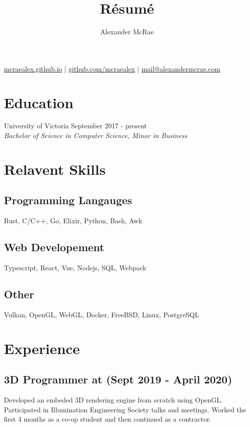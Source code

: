 \documentclass{article}
\makeatletter
\renewcommand{\maketitle}{
\begin{center}
{\huge \bfseries \theauthor}

\vspace{0.25em}
\url{mcraealex.github.io} | \url{github.com/mcraealex} | \href{mailto:mail@alexandermcrae.com}{mail@alexandermcrae.com}
\end{center}}
\newcommand{\hrefColored}[3]{\href{#2}{\color{#1}{#3}}}
\makeatother
\begin{document}
\title{R\'esum\'e}
\author{Alexander McRae}

\maketitle

\section{Education}

\noindent University of Victoria \hfill September 2017 - present\\
\textit{Bachelor of Science in Computer Science, Minor in Business}

\section{Relavent Skills}

\subsection{Programming Langauges}

Rust, C/C++, Go, Elixir, Python, Bash, Awk

\subsection{Web Developement}

Typescript, React, Vue, Nodejs, SQL, Webpack

\subsection{Other}

Vulkan, OpenGL, WebGL, Docker, FreeBSD, Linux, PostgreSQL

\section{Experience}

\subsection{3D Programmer at \hrefColored{blue}{https://www.suntrackertech.com}{Suntracker Technologies Ltd.} (Sept 2019 - April 2020)}

Developed an embeded 3D rendering engine from scratch using OpenGL. Participated
in Illumination Engineering Society talks and meetings. Worked the first 4 
months as a co-op student and then continued as a contractor.
\end{document}
